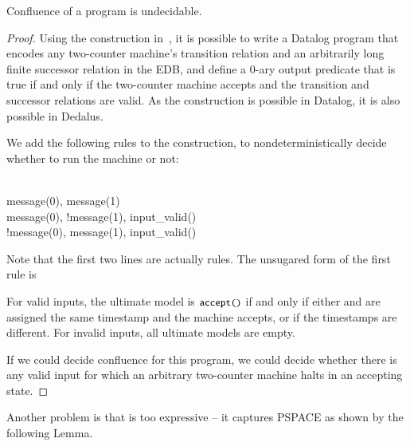 \begin{lemma}
\label{lem:confluence-undecidable}
Confluence of a \lang program is undecidable.
\end{lemma}
\begin{proof}
Using the construction in~\cite{undecidable-datalog}, it is possible to write a Datalog program that encodes any two-counter machine's transition relation and an arbitrarily long finite successor relation in the EDB, and define a 0-ary output predicate  that is true if and only if the two-counter machine accepts and the transition and successor relations are valid.  As the construction is possible in Datalog, it is also possible in Dedalus.

We add the following rules to the construction, to nondeterministically decide whether to run the machine or not:

\begin{Drules}
   \\
        {message(0), message(1)} \\
        {message(0), !message(1), input\_valid()} \\
        {!message(0), message(1), input\_valid()}
\end{Drules}

Note that the first two lines are actually rules.  The unsugared form of the first rule is 

For valid inputs, the ultimate model is ${\dedalus{accept()}}$ if and only if either  and  are assigned the same timestamp and the machine accepts, or if the timestamps are different.  For invalid inputs, all ultimate models are empty.

If we could decide confluence for this program, we could decide whether there is any valid input for which an arbitrary two-counter machine halts in an accepting state.
\end{proof}


Another problem is that \lang is too expressive -- it captures PSPACE as shown by the following Lemma.

